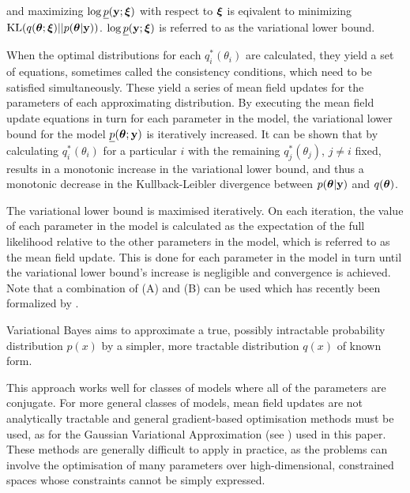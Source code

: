 \noindent and maximizing $\log \underline{p}({\bf y};{\boldsymbol \xi})$ with respect to ${\boldsymbol \xi}$ is eqivalent to minimizing
$\text{KL}(q({\boldsymbol \theta};{\boldsymbol \xi})||p({\boldsymbol \theta}|{\bf y}))$. $\log \underline{p}({\bf y};{\boldsymbol \xi})$ is referred to as the
variational lower bound.

\noindent When the optimal distributions for each $q_i^*(\theta_i)$ are calculated, they yield a set of
equations, sometimes called the consistency conditions, which need to be  satisfied simultaneously. These
yield a series of mean field updates for the parameters of each approximating distribution. By executing the
mean field update equations in turn for each parameter in the model, the variational lower bound for the model
$\underline{p}({\boldsymbol \theta}; {\bf y})$ is iteratively increased. It can be shown that by calculating $q_i^*(\theta_i)$
for  a particular $i$ with the remaining $q_j^*(\theta_j)$, $j\ne i$ fixed, results in a monotonic increase in
the variational lower bound, and thus a monotonic decrease in the Kullback-Leibler divergence between
$p({\boldsymbol \theta}|{\bf y})$ and $q({\boldsymbol \theta})$.

\noindent The variational lower bound is maximised iteratively. On each iteration, the value of each parameter
in the model is calculated as the expectation of the full likelihood relative to the other parameters in the
model, which is referred to as the mean field update. This is done for each parameter in the model in turn
until the variational lower bound's increase is negligible and convergence is achieved. Note that a
combination of (A) and (B) can be used which has recently been formalized by \cite{Rohde2015}.

\noindent Variational Bayes aims to approximate a true, possibly intractable probability distribution $p(x)$
by a simpler, more tractable distribution $q(x)$ of known form.

This approach works well for classes of models where all of the parameters are conjugate. For more
general classes of models, mean field updates are not analytically tractable and general gradient-based
optimisation methods must be used, as for the Gaussian Variational Approximation (see \citep{Ormerod2012}) used
in this paper. These methods are generally difficult to apply in practice, as the problems can involve the
optimisation of many parameters over high-dimensional, constrained spaces whose constraints cannot be simply
expressed.



